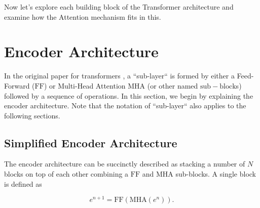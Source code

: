 Now let's explore each building block of the Transformer architecture and examine how the Attention mechanism fits in this.




\section{Encoder Architecture}\label{sec:enc}

In the original paper for transformers \citep{vaswani2017attention}, a ``sub-layer`` is formed by either a Feed-Forward ($\mathrm{FF}$) or Multi-Head Attention $\mathrm{MHA}$ (or other named $\mathrm{sub-block}$s) followed by a sequence of operations. In this section, we begin by explaining the encoder architecture. Note that the notation of ``sub-layer`` also applies to the following sections.

\subsection{Simplified Encoder Architecture}

The encoder architecture can be succinctly described as stacking a number of $N$ blocks on top of each other combining a $\mathrm{FF}$ and $\mathrm{MHA}$ sub-blocks. A single block is defined as

\begin{equation}
e^{n+1} = \mathrm{FF}(\mathrm{MHA}(e^n)).
\end{equation}

